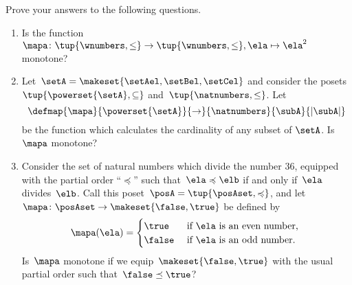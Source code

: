 \clearpage
\vfill
\begin{gradedexercise}
    \label{ex:MonotoneMapCheck}

    Prove your answers to the following questions.
    \begin{enumerate}
        \item Is the function~$\mapa \colon \tup{\wnumbers, \leq} \to \tup{\wnumbers, \leq}, \ela \mapsto \ela^2$ monotone?
        \item Let~$\setA = \makeset{\setAel, \setBel, \setCel}$ and consider the posets~$\tup{\powerset{\setA}, \subseteq}$ and~$\tup{\natnumbers, \leq}$.
              Let
              \begin{equation*}
                  \defmap{\mapa}{\powerset{\setA}}{\to}{\natnumbers}{\subA}{\vert \subA \vert}
              \end{equation*}
              be the function which calculates the cardinality of any subset of $\setA$.
              Is $\mapa$ monotone?
        \item Consider the set of natural numbers which divide the number 36, equipped with the partial order ``$\preccurlyeq$'' such that~$\ela \preccurlyeq \elb$ if and only if~$\ela$ divides~$\elb$.
              Call this poset~$\posA = \tup{\posAset, \preccurlyeq}$, and let~$\mapa \colon \posAset \to \makeset{\false, \true}$ be defined by
              \begin{equation}
                  \mapa(\ela) =
                  \begin{cases}
                      \true  & \text{ if } \ela \text{ is an even number, } \\
                      \false & \text{ if } \ela \text{ is an odd number.
                      }
                  \end{cases}
              \end{equation}
              Is~$\mapa$ monotone if we equip~$\makeset{\false, \true}$ with the usual partial order such that~$\false \preceq \true$?
    \end{enumerate}
\end{gradedexercise}

